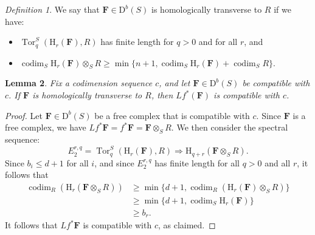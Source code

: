 \documentclass[12pt]{amsart}
\newtheorem{lemma}{Lemma}[section]
\theoremstyle{definition}
\theoremstyle{remark}
\newtheorem{defn}[lemma]{Definition}
\newcommand{\Spec}{\operatorname{Spec}}
\newcommand{\Tor}{\operatorname{Tor}}
\newcommand{\kk}{\Bbbk}
\newcommand{\codim}{\operatorname{codim}}
\newcommand{\PP}{\mathbb{P}}
\newcommand{\HH}{\mathrm{H}}
\newcommand{\ZZ}{\mathbb{Z}}
\newcommand{\cc}{c}
\newcommand{\cO}{\mathcal{O}}
\newcommand{\cE}{\mathcal{E}}
\newcommand{\FF}{\mathbf{F}}
\newcommand{\defi}[1]{\textsf{#1}} %
\newcommand{\DD}{\mathrm{D}}
\newcommand{\CQ}{\mathrm{C}}
\newcommand{\BBQ}{\mathrm{B}}
\begin{document}
\begin{defn}
We say that $\FF\in \DD^b(S)$ \defi{ is homologically transverse to $R$} if we have:
\begin{itemize}
	\item $\Tor^S_q(\HH_r(\FF),R)$ has finite length for $q>0$ and for all $r$, and
	\item $\codim_S \HH_r(\FF)\otimes_S R\geq \min\{n+1, \codim_S \HH_r({\FF})+\codim_S R\}.$
\end{itemize}
\end{defn}




 \begin{lemma}\label{lem:pushpull}
Fix a codimension sequence $\cc$, and let $\FF\in \DD^b(S)$ be compatible with $\cc$.  If $\FF$ is homologically transverse to $R$, then $Lf^*(\FF)$ is compatible with $\cc$.
%

\end{lemma}
\begin{proof}
Let $\FF\in \DD^b(S)$ be a free complex that is compatible with $\cc$.  
Since $\FF$ is a free complex, we have $Lf^*\FF=f^*\FF=\FF\otimes_S R$.   We then consider the spectral sequence:
\[
E^{r,q}_2=\Tor^S_{q}(\HH_r(\FF),R)\Rightarrow \HH_{q+r}(\FF\otimes_S R).
\]
Since $b_i\leq d+1$ for all $i$, and since $E^{r,q}_2$ has finite length for all $q>0$ and all $r$, it follows that
\begin{align*}
\codim_R \left(\HH_{r}(\FF\otimes_S R)\right) &\geq \min\{d+1, \codim_R\left( \HH_r(\FF)\otimes_S R\right)\} \\
&\geq \min\{d+1, \codim_S \HH_r(\FF)\}\\
& \geq b_r.
\end{align*}
It follows that $Lf^*\FF$ is compatible with $\cc$, as claimed.
\end{proof}
\end{document}
